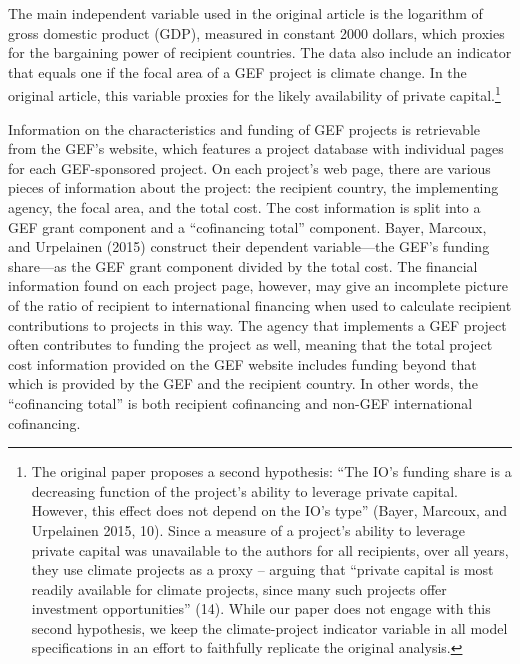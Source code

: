 \documentclass{article}
\begin{document}
The main independent variable used in the original article is the logarithm of gross domestic product (GDP), measured in constant 2000 dollars, which proxies for the bargaining power of recipient countries.  The data also include an indicator that equals one if the focal area of a GEF project is climate change.  In the original article, this variable proxies for the likely availability of private capital.\footnote{The original paper proposes a second hypothesis: “The IO’s funding share is a decreasing function of the project’s ability to leverage private capital. However, this effect does not depend on the IO’s type” (Bayer, Marcoux, and Urpelainen 2015, 10).  Since a measure of a project’s ability to leverage private capital was unavailable to the authors for all recipients, over all years, they use climate projects as a proxy – arguing that “private capital is most readily available for climate projects, since many such projects offer investment opportunities” (14).  While our paper does not engage with this second hypothesis, we keep the climate-project indicator variable in all model specifications in an effort to faithfully replicate the original analysis.} 

Information on the characteristics and funding of GEF projects is retrievable from the GEF’s website, which features a project database with individual pages for each GEF-sponsored project.  On each project’s web page, there are various pieces of information about the project: the recipient country, the implementing agency, the focal area, and the total cost.  The cost information is split into a GEF grant component and a “cofinancing total” component.  Bayer, Marcoux, and Urpelainen (2015) construct their dependent variable---the GEF’s funding share---as the GEF grant component divided by the total cost. 
The financial information found on each project page, however, may give an incomplete picture of the ratio of recipient to international financing when used to calculate recipient contributions to projects in this way.  The agency that implements a GEF project often contributes to funding the project as well, meaning that the total project cost information provided on the GEF website includes funding beyond that which is provided by the GEF and the recipient country.  In other words, the “cofinancing total” is both recipient cofinancing and non-GEF international cofinancing. 
\end{document}
